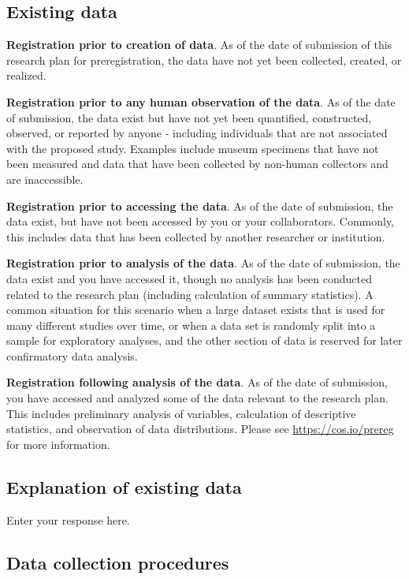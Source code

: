 \documentclass[]{article}
\begin{document}
\subsection{Existing data}\label{existing-data}

\textbf{Registration prior to creation of data}. As of the date of
submission of this research plan for preregistration, the data have not
yet been collected, created, or realized.

\textbf{Registration prior to any human observation of the data}. As of
the date of submission, the data exist but have not yet been quantified,
constructed, observed, or reported by anyone - including individuals
that are not associated with the proposed study. Examples include museum
specimens that have not been measured and data that have been collected
by non-human collectors and are inaccessible.

\textbf{Registration prior to accessing the data}. As of the date of
submission, the data exist, but have not been accessed by you or your
collaborators. Commonly, this includes data that has been collected by
another researcher or institution.

\textbf{Registration prior to analysis of the data}. As of the date of
submission, the data exist and you have accessed it, though no analysis
has been conducted related to the research plan (including calculation
of summary statistics). A common situation for this scenario when a
large dataset exists that is used for many different studies over time,
or when a data set is randomly split into a sample for exploratory
analyses, and the other section of data is reserved for later
confirmatory data analysis.

\textbf{Registration following analysis of the data}. As of the date of
submission, you have accessed and analyzed some of the data relevant to
the research plan. This includes preliminary analysis of variables,
calculation of descriptive statistics, and observation of data
distributions. Please see \url{https://cos.io/prereg} for more
information.

\subsection{Explanation of existing
data}\label{explanation-of-existing-data}

Enter your response here.

\subsection{Data collection
procedures}\label{data-collection-procedures}
\end{document}
